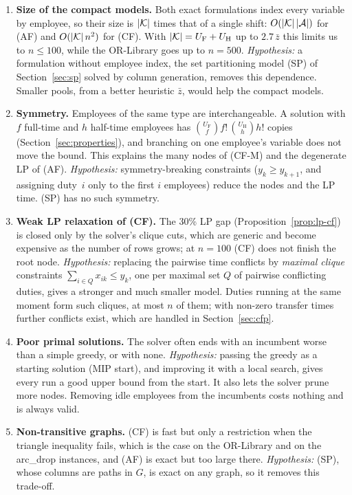 \begin{enumerate}[label=\textbf{B\arabic*.}]
  \item \textbf{Size of the compact models.} Both exact formulations index
    every variable by employee, so their size is $|\mathcal{K}|$ times that of a single
    shift: $O(|\mathcal{K}|\,|\mathcal{A}|)$ for (AF) and $O(|\mathcal{K}|\,n^2)$ for (CF). With
    $|\mathcal{K}|=U_{\mathrm F}+U_{\mathrm H}$ up to $2.7\,\bar z$ this limits us to
    $n\le 100$, while the
    OR-Library goes up to $n=500$. \emph{Hypothesis:} a formulation without
    employee index, the set partitioning model (SP) of
    Section~\ref{sec:sp} solved by column generation, removes this
    dependence. Smaller pools, from a better heuristic $\bar z$, would help
    the compact models.
  \item \textbf{Symmetry.} Employees of the same type are interchangeable.
    A solution with $f$ full-time and $h$ half-time employees has
    $\binom{U_{\mathrm F}}{f}f!\,\binom{U_{\mathrm H}}{h}h!$ copies
    (Section~\ref{sec:properties}), and branching on one employee's
    variable does not move the bound. This explains the many
    nodes of (CF-M) and the degenerate LP of (AF). \emph{Hypothesis:}
    symmetry-breaking constraints ($y_k\ge y_{k+1}$, and assigning
    duty~$i$ only to the first $i$ employees) reduce the nodes and the LP
    time. (SP) has no such symmetry.
  \item \textbf{Weak LP relaxation of (CF).} The 30\% LP gap
    (Proposition~\ref{prop:lp-cf}) is closed only by the solver's clique
    cuts, which are generic and become expensive as the number of rows
    grows; at $n=100$ (CF) does not finish the root node. \emph{Hypothesis:}
    replacing the pairwise time conflicts by \emph{maximal clique}
    constraints $\sum_{i\in Q}x_{ik}\le y_k$, one per maximal set $Q$ of
    pairwise conflicting duties, gives a stronger and much smaller model.
    Duties running at the same moment form such cliques, at most $n$ of
    them; with non-zero transfer times further conflicts exist, which are
    handled in Section~\ref{sec:cfp}.
  \item \textbf{Poor primal solutions.} The solver often ends with an
    incumbent worse than a simple greedy, or with none. \emph{Hypothesis:}
    passing the greedy as a starting solution (MIP start), and improving it
    with a local search, gives every run a good upper bound from the
    start. It also lets the solver prune more nodes. Removing idle employees
    from the incumbents costs nothing and is always valid.
  \item \textbf{Non-transitive graphs.} (CF) is fast but only a restriction
    when the triangle inequality fails, which is the case on the OR-Library
    and on the arc\_drop instances, and (AF) is exact but too large there.
    \emph{Hypothesis:} (SP), whose columns are paths in $G$, is exact on any
    graph, so it removes this trade-off.
\end{enumerate}

